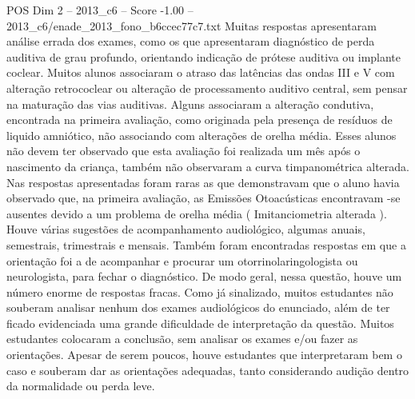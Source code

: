 \begin{textsample}{POS Dim 2 – 2013\_c6 – Score -1.00 – 2013\_c6/enade\_2013\_fono\_b6ccec77c7.txt}
Muitas respostas apresentaram análise errada dos exames, como os que apresentaram diagnóstico de perda auditiva de grau profundo, orientando indicação de prótese auditiva ou implante coclear.
Muitos alunos associaram o atraso das latências das ondas III e V com alteração retrococlear ou alteração de processamento auditivo central, sem pensar na maturação das vias auditivas.
Alguns associaram a alteração condutiva, encontrada na primeira avaliação, como originada pela presença de resíduos de liquido amniótico, não associando com alterações de orelha média.
Esses alunos não devem ter observado que esta avaliação foi realizada um mês após o nascimento da criança, também não observaram a curva timpanométrica alterada.
Nas respostas apresentadas foram raras as que demonstravam que o aluno havia observado que, na primeira avaliação, as Emissões Otoacústicas encontravam -se ausentes devido a um problema de orelha média ( Imitanciometria alterada ).
Houve várias sugestões de acompanhamento audiológico, algumas anuais, semestrais, trimestrais e mensais.
Também foram encontradas respostas em que a orientação foi a de acompanhar e procurar um otorrinolaringologista ou neurologista, para fechar o diagnóstico.
De modo geral, nessa questão, houve um número enorme de respostas fracas.
Como já sinalizado, muitos estudantes não souberam analisar nenhum dos exames audiológicos do enunciado, além de ter ficado evidenciada uma grande dificuldade de interpretação da questão.
Muitos estudantes colocaram a conclusão, sem analisar os exames e/ou fazer as orientações.
Apesar de serem poucos, houve estudantes que interpretaram bem o caso e souberam dar as orientações adequadas, tanto considerando audição dentro da normalidade ou perda leve.

\end{textsample}
